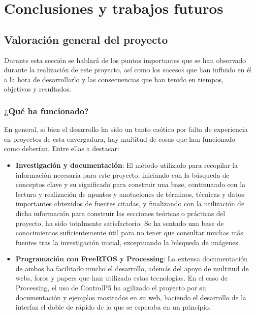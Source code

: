 \chapter{Conclusiones y trabajos futuros}


\noindent{}


\section{Valoración general del proyecto}

Durante esta sección se hablará de los puntos importantes que se han observado durante la realización de este proyecto, así como los sucesos que han influido en él a la hora de desarrollarlo y las consecuencias que han tenido en tiempos, objetivos y resultados. 

\subsection{¿Qué ha funcionado?}

En general, si bien el desarrollo ha sido un tanto caótico por falta de experiencia en proyectos de esta envergadura, hay multitud de cosas que han funcionado como deberían. Entre ellas a destacar:

\begin{itemize}
    \item \textbf{Investigación y documentación}: El método utilizado para recopilar la información necesaria para este proyecto, iniciando con la búsqueda de conceptos clave y su significado para construir una base, continuando con la lectura y realización de apuntes y anotaciones de términos, técnicas y datos importantes obtenidos de fuentes citadas, y finalizando con la utilización de dicha información para construir las secciones teóricas o prácticas del proyecto, ha sido totalmente satisfactorio. Se ha sentado una base de conocimientos suficientemente útil para no tener que consultar muchas más fuentes tras la investigación inicial, exceptuando la búsqueda de imágenes. 
    \item \textbf{Programación con FreeRTOS y Processing}: La extensa documentación de ambos ha facilitado mucho el desarrollo, además del apoyo de multitud de webs, foros y papers que han utilizado estas tecnologías. En el caso de Processing, el uso de ControlP5 ha agilizado el proyecto por su documentación y ejemplos mostrados en su web, haciendo el desarrollo de la interfaz el doble de rápido de lo que se esperaba en un principio.
\end{itemize}

